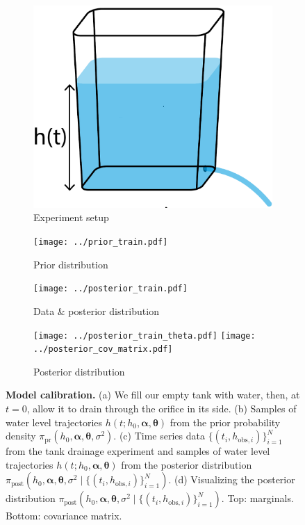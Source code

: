 \documentclass[openacc]{rsproca_new}%
\newcommand\thedata {$\{(t_i,h_{\text{obs}, i})\}_{i=1}^{N}$\xspace}
\newcommand\thedatanomath {\{(t_i,h_{\text{obs}, i})\}_{i=1}^{N}}
\newcommand\themodel {$h(t; h_0, \boldsymbol \alpha, \boldsymbol\theta)$\xspace}
\newcommand\thevars{h_0, \boldsymbol \alpha, \boldsymbol \theta, \sigma^2}
\begin{document}
\begin{figure}[h!]
    \centering
        \begin{subfigure}[b]{0.2\textwidth}
    	\includegraphics[width=\textwidth]{../tank_geometry/naked_tank.pdf}
	\caption{Experiment setup} \label{fig:naked_tank}
    \end{subfigure}
    
     \begin{subfigure}[b]{0.4\textwidth}
    	\texttt{[image: ../prior\_train.pdf]}
	\caption{Prior distribution} \label{fig:prior_train}
    \end{subfigure}
     \begin{subfigure}[b]{0.4\textwidth}
    	\texttt{[image: ../posterior\_train.pdf]}
	\caption{Data \& posterior distribution} \label{fig:posterior_train}
    \end{subfigure}
    
     \begin{subfigure}[b]{\textwidth}
     \center
    	\texttt{[image: ../posterior\_train\_theta.pdf]}
	\texttt{[image: ../posterior\_cov\_matrix.pdf]}
	\caption{Posterior distribution} \label{fig:posterior_train_theta}
    \end{subfigure}
    \caption{
      \textbf{Model calibration.}
      (a) We fill our empty tank with water, then, at $t=0$, allow it to drain through the orifice in its side.
      (b) Samples of water level trajectories \themodel from the prior probability density $\pi_{\text{pr}}(\thevars)$.
      (c) Time series data \thedata from the tank drainage experiment and samples of water level trajectories \themodel from the posterior distribution $\pi_{\text{post}}(\thevars \mid \thedatanomath)$.
      (d) Visualizing the posterior distribution $\pi_{\text{post}}(\thevars \mid \thedatanomath)$. Top: marginals. Bottom: covariance matrix.      
      }
\end{figure}
\end{document}
